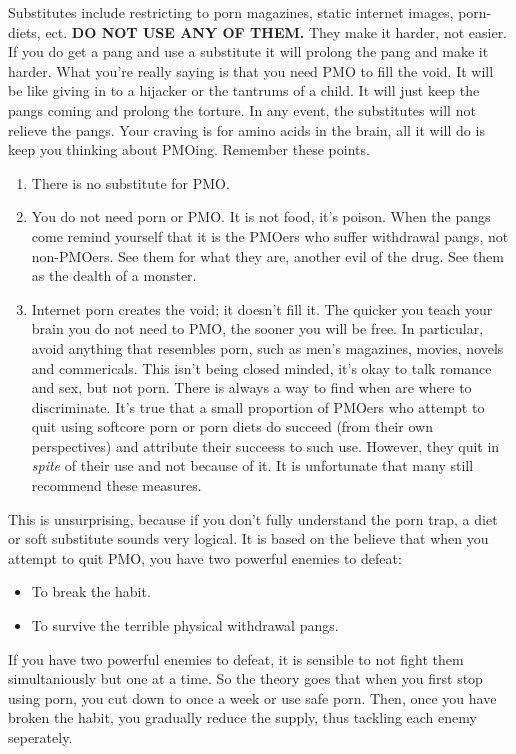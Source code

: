 \documentclass[easypeasy.tex]{subfiles}
\begin{document}
Substitutes include restricting to porn magazines, static internet images, porn-diets, ect. \textbf{DO NOT USE ANY OF THEM.} They make it harder, not easier. If you do get a pang and use a substitute it will prolong the pang and make it harder. What you're really saying is that you need PMO to fill the void. It will be like giving in to a hijacker or the tantrums of a child. It will just keep the pangs coming and prolong the torture. In any event, the substitutes will not relieve the pangs. Your craving is for amino acids in the brain, all it will do is keep you thinking about PMOing. Remember these points.
\begin{enumerate}
  \item There is no substitute for PMO.
  \item You do not need porn or PMO. It is not food, it's poison. When the pangs come remind yourself that it is the PMOers who suffer withdrawal pangs, not non-PMOers. See them for what they are, another evil of the drug. See them as the dealth of a monster.
  \item Internet porn creates the void; it doesn't fill it. The quicker you teach your brain you do not need to PMO, the sooner you will be free. In particular, avoid anything that resembles porn, such as men's magazines, movies, novels and commericals. This isn't being closed minded, it's okay to talk romance and sex, but not porn. There is always a way to find when are where to discriminate. It's true that a small proportion of PMOers who attempt to quit using softcore porn or porn diets do succeed (from their own perspectives) and attribute their succeess to such use. However, they quit in \textit{spite} of their use and not because of it. It is unfortunate that many still recommend these measures.
\end{enumerate}
This is unsurprising, because if you don't fully understand the porn trap, a diet or soft substitute sounds very logical. It is based on the believe that when you attempt to quit PMO, you have two powerful enemies to defeat:
\begin{itemize}
  \item To break the habit.
  \item To survive the terrible physical withdrawal pangs.
\end{itemize}

If you have two powerful enemies to defeat, it is sensible to not fight them simultaniously but one at a time. So the theory goes that when you first stop using porn, you cut down to once a week or use safe porn. Then, once you have broken the habit, you gradually reduce the supply, thus tackling each enemy seperately.
\end{document}
